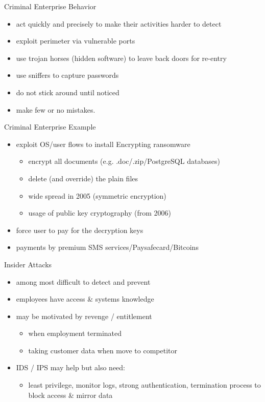 \documentclass{beamer}
\begin{document}
\begin{frame}{Criminal Enterprise Behavior}
  \begin{itemize}
  \item act quickly and precisely to make their activities 
    harder to detect
  \item exploit perimeter via vulnerable ports
  \item use trojan horses (hidden software) to leave 
    back doors for re-entry
  \item use sniffers to capture passwords
  \item do not stick around until noticed
  \item make few or no mistakes. 
  \end{itemize}
\end{frame}

\begin{frame}{Criminal Enterprise Example}
  \begin{itemize}
  \item exploit OS/user flows to install Encrypting ransomware
    \begin{itemize}
      \item encrypt all documents (e.g. .doc/.zip/PostgreSQL databases)
      \item delete (and override) the plain files
      \item wide spread in 2005 (symmetric encryption)
      \item usage of public key cryptography (from 2006)
    \end{itemize}
  \item force user to pay for the decryption keys
  \item payments by premium SMS services/Paysafecard/Bitcoins
  \end{itemize}
\end{frame}

\begin{frame}{Insider Attacks}
  \begin{itemize}
  \item among most difficult to detect and prevent 
  \item employees have access \& systems knowledge 
  \item may be motivated by revenge / entitlement 
      \begin{itemize}
      \item when employment terminated 
      \item taking customer data when move to competitor 
      \end{itemize}
  \item IDS / IPS may help but also need: 
      \begin{itemize}
      \item least privilege, monitor logs, strong authentication, 
        termination process to block access \& mirror data 
      \end{itemize}
  \end{itemize}
\end{frame}
\end{document}

